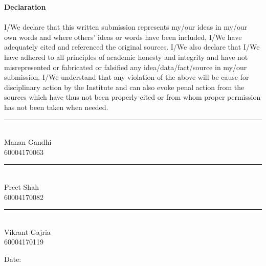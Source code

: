 \begingroup
\makeatletter

\thispagestyle{plain}
\fontsize{14pt}{18pt} \selectfont

\centerline{\fontsize{22}{26}\selectfont\bf Declaration}
\vspace{4pt}

\paragraph{}
I/We declare that this written submission represents my/our ideas in my/our own words and where others' ideas or words have been included, I/We have adequately cited and referenced the original sources. I/We also declare that I/We have adhered to all principles of academic honesty and integrity and have not misrepresented or fabricated or falsified any idea/data/fact/source in my/our submission. I/We understand that any violation of the above will be cause for disciplinary action by the Institute and can also evoke penal action from the sources which have thus not been properly cited or from whom proper permission has not been taken when needed. 

\begin{flushright}
    \vspace{0.5in} %
    
    \rule{5cm}{1pt} \\
    Manan Gandhi \\
    60004170063
    
    \vspace{0.5in}
    
    \rule{5cm}{1pt} \\
    Preet Shah \\
    60004170082
    
    \vspace{0.5in}
    
    \rule{5cm}{1pt} \\
    Vikrant Gajria \\
    60004170119
\end{flushright}

\vfill
\begin{flushleft}
Date: \\
\end{flushleft}

%
\pagebreak

\endgroup
\makeatother
